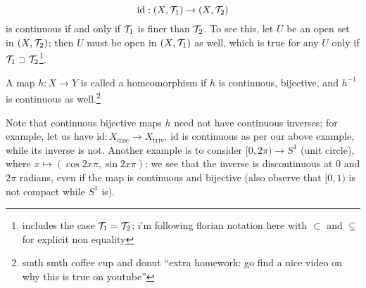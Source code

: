 \[ \mathrm{id} : (X, \mathcal T_1) \to (X, \mathcal T_2) \]
is continuous if and only if $\mathcal T_1$ is finer than $\mathcal T_2$. To see this, let $U$ be an open set in $(X, \mathcal T_2)$; then $U$ must be open in $(X, \mathcal T_1)$ as well, which is true for any $U$ only if $\mathcal T_1 \supset \mathcal T_2$\footnote{includes the case $\mathcal T_1 = \mathcal T_2$; i'm following florian notation here with $\subset$ and $\subsetneq$ for explicit non equality}.
\begin{definition}[Homeomorphism]
    A map $h : X \to Y$ is called a homeomorphism if $h$ is continuous, bijective, and $h^{-1}$ is continuous as well.\footnote{smth smth coffee cup and donut ``extra homework: go find a nice video on why this is true on youtube''}
\end{definition}
\noindent Note that continuous bijective maps $h$ need not have continuous inverses; for example, let us have $\mathrm{id} : X_\mathrm{disc} \to X_\mathrm{triv}$. $\mathrm{id}$ is continuous as per our above example, while its inverse is not. Another example is to consider $[0, 2\pi) \to S^1$ (unit circle), where $x \mapsto (\cos 2x\pi, \sin 2x\pi)$; we see that the inverse is discontinuous at $0$ and $2\pi$ radians, even if the map is continuous and bijective (also observe that $[0, 1)$ is not compact while $S^1$ is).

